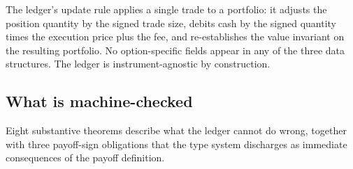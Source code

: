 \documentclass[
  11pt,
  letterpaper,
  DIV=12,
  numbers=noendperiod]{scrartcl}
\numberwithin{equation}{section}
\numberwithin{figure}{section}
\numberwithin{table}{section}
\begin{document}
The ledger's update rule applies a single trade to a portfolio: it
adjusts the position quantity by the signed trade size, debits cash by
the signed quantity times the execution price plus the fee, and
re-establishes the value invariant on the resulting portfolio. No
option-specific fields appear in any of the three data structures. The
ledger is instrument-agnostic by construction.

\subsection{What is machine-checked}\label{sec-ledger-proofs}

Eight substantive theorems describe what the ledger cannot do wrong,
together with three payoff-sign obligations that the type system
discharges as immediate consequences of the payoff definition.
\end{document}
